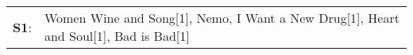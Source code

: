 \begin{supertabular}{p{0.03\textwidth}p{0.92\textwidth}}
 \textbf{S1}:  &  Women Wine and Song[1]\textsuperscript{}, \enspace Nemo\textsuperscript{}, \enspace I Want a New Drug[1]\textsuperscript{}, \enspace Heart and Soul[1]\textsuperscript{}, \enspace Bad is Bad[1]\textsuperscript{}  \enspace  \\
\end{supertabular}
